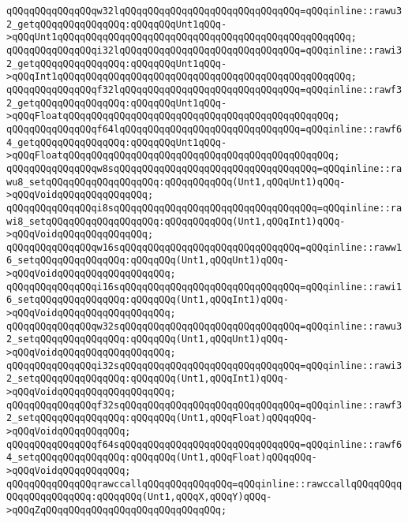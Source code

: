 \verb|qQQqqQQqqQQqqQQqw32lqQQqqQQqqQQqqQQqqQQqqQQqqQQqqQQq=qQQqinline::rawu32_getqQQqqQQqqQQqqQQq:qQQqqQQqUnt1qQQq->qQQqUnt1qQQqqQQqqQQqqQQqqQQqqQQqqQQqqQQqqQQqqQQqqQQqqQQqqQQq;|\newline
\verb|qQQqqQQqqQQqqQQqi32lqQQqqQQqqQQqqQQqqQQqqQQqqQQqqQQq=qQQqinline::rawi32_getqQQqqQQqqQQqqQQq:qQQqqQQqUnt1qQQq->qQQqInt1qQQqqQQqqQQqqQQqqQQqqQQqqQQqqQQqqQQqqQQqqQQqqQQqqQQq;|\newline
\verb|qQQqqQQqqQQqqQQqf32lqQQqqQQqqQQqqQQqqQQqqQQqqQQqqQQq=qQQqinline::rawf32_getqQQqqQQqqQQqqQQq:qQQqqQQqUnt1qQQq->qQQqFloatqQQqqQQqqQQqqQQqqQQqqQQqqQQqqQQqqQQqqQQqqQQqqQQq;|\newline
\verb|qQQqqQQqqQQqqQQqf64lqQQqqQQqqQQqqQQqqQQqqQQqqQQqqQQq=qQQqinline::rawf64_getqQQqqQQqqQQqqQQq:qQQqqQQqUnt1qQQq->qQQqFloatqQQqqQQqqQQqqQQqqQQqqQQqqQQqqQQqqQQqqQQqqQQqqQQq;|\newline
\verb|qQQqqQQqqQQqqQQqw8sqQQqqQQqqQQqqQQqqQQqqQQqqQQqqQQqqQQq=qQQqinline::rawu8_setqQQqqQQqqQQqqQQqqQQq:qQQqqQQqqQQq(Unt1,qQQqUnt1)qQQq->qQQqVoidqQQqqQQqqQQqqQQq;|\newline
\verb|qQQqqQQqqQQqqQQqi8sqQQqqQQqqQQqqQQqqQQqqQQqqQQqqQQqqQQq=qQQqinline::rawi8_setqQQqqQQqqQQqqQQqqQQq:qQQqqQQqqQQq(Unt1,qQQqInt1)qQQq->qQQqVoidqQQqqQQqqQQqqQQq;|\newline
\verb|qQQqqQQqqQQqqQQqw16sqQQqqQQqqQQqqQQqqQQqqQQqqQQqqQQq=qQQqinline::raww16_setqQQqqQQqqQQqqQQq:qQQqqQQq(Unt1,qQQqUnt1)qQQq->qQQqVoidqQQqqQQqqQQqqQQqqQQq;|\newline
\verb|qQQqqQQqqQQqqQQqi16sqQQqqQQqqQQqqQQqqQQqqQQqqQQqqQQq=qQQqinline::rawi16_setqQQqqQQqqQQqqQQq:qQQqqQQq(Unt1,qQQqInt1)qQQq->qQQqVoidqQQqqQQqqQQqqQQqqQQq;|\newline
\verb|qQQqqQQqqQQqqQQqw32sqQQqqQQqqQQqqQQqqQQqqQQqqQQqqQQq=qQQqinline::rawu32_setqQQqqQQqqQQqqQQq:qQQqqQQq(Unt1,qQQqUnt1)qQQq->qQQqVoidqQQqqQQqqQQqqQQqqQQq;|\newline
\verb|qQQqqQQqqQQqqQQqi32sqQQqqQQqqQQqqQQqqQQqqQQqqQQqqQQq=qQQqinline::rawi32_setqQQqqQQqqQQqqQQq:qQQqqQQq(Unt1,qQQqInt1)qQQq->qQQqVoidqQQqqQQqqQQqqQQqqQQq;|\newline
\verb|qQQqqQQqqQQqqQQqf32sqQQqqQQqqQQqqQQqqQQqqQQqqQQqqQQq=qQQqinline::rawf32_setqQQqqQQqqQQqqQQq:qQQqqQQq(Unt1,qQQqFloat)qQQqqQQq->qQQqVoidqQQqqQQqqQQq;|\newline
\verb|qQQqqQQqqQQqqQQqf64sqQQqqQQqqQQqqQQqqQQqqQQqqQQqqQQq=qQQqinline::rawf64_setqQQqqQQqqQQqqQQq:qQQqqQQq(Unt1,qQQqFloat)qQQqqQQq->qQQqVoidqQQqqQQqqQQq;|\newline
\verb|qQQqqQQqqQQqqQQqrawccallqQQqqQQqqQQqqQQq=qQQqinline::rawccallqQQqqQQqqQQqqQQqqQQqqQQq:qQQqqQQq(Unt1,qQQqX,qQQqY)qQQq->qQQqZqQQqqQQqqQQqqQQqqQQqqQQqqQQqqQQq;|\newline

